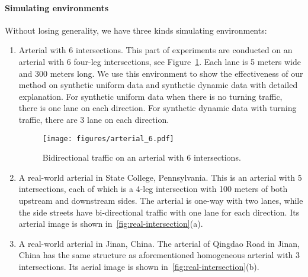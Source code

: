 \paragraph{Simulating environments}
Without losing generality, we have three kinds simulating environments:
\begin{enumerate}[wide,noitemsep,topsep=0pt]
\item Arterial with 6 intersections. This part of experiments are conducted on an arterial with 6 four-leg intersections, see Figure~\ref{fig:Traffic-direc-pattern}. Each lane is 5 meters wide and 300 meters long. We use this environment to show the effectiveness of our method on synthetic uniform data and synthetic dynamic data with detailed explanation. For synthetic uniform data when there is no turning traffic, there is one lane on each direction. For synthetic dynamic data with turning traffic, there are 3 lane on each direction.

\begin{figure}[htb]
  \centering
	\texttt{[image: figures/arterial\_6.pdf]}
     \caption{Bidirectional traffic on an arterial with 6 intersections.}   
    \label{fig:Traffic-direc-pattern}
\end{figure}


\item A real-world arterial in State College, Pennsylvania. This is an arterial with 5 intersections, each of which is a 4-leg intersection with 100 meters of both upstream and downstream sides. The arterial is one-way with two lanes, while the side streets have bi-directional traffic with one lane for each direction. Its arterial image is shown in~\ref{fig:real-intersection}(a).

\item A real-world arterial in Jinan, China. The arterial of Qingdao Road in Jinan, China has the same structure as aforementioned homogeneous arterial with 3 intersections. Its aerial image is shown in~\ref{fig:real-intersection}(b).

\end{enumerate}


